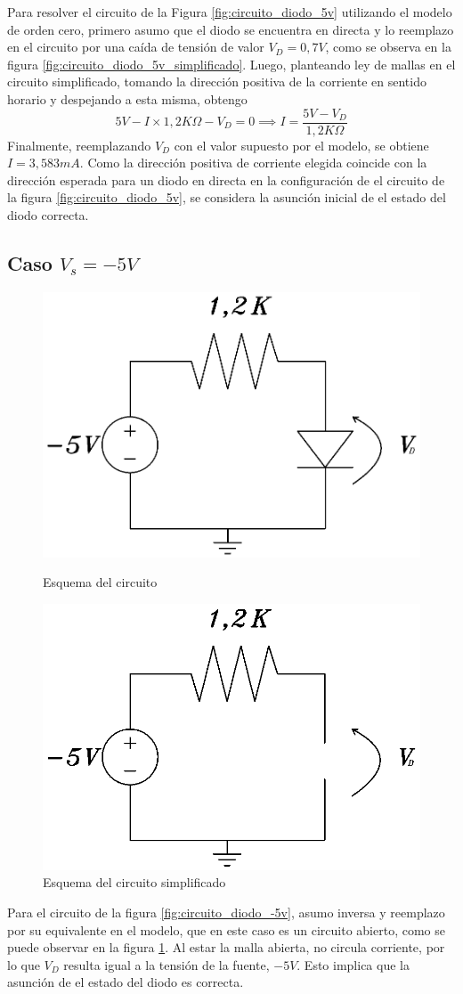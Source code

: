 \documentclass[10pt]{article}
\begin{document}
\quad Para resolver el circuito de la Figura \ref{fig:circuito_diodo_5v} utilizando el modelo de orden cero, primero asumo que el diodo se encuentra en directa y lo reemplazo en el circuito por una caída de tensión de valor $V_D = 0,7V$, como se observa en la figura \ref{fig:circuito_diodo_5v_simplificado}.
\quad Luego, planteando ley de mallas en el circuito simplificado, tomando la dirección positiva de la corriente en sentido horario y despejando a esta misma, obtengo 
$$5V-I\times1,2K\Omega-V_D=0 \implies I=\frac{5V-V_D}{1,2K\Omega}$$ Finalmente, reemplazando $V_D$ con el valor supuesto por el modelo, se obtiene $I = 3,583mA$. Como la dirección positiva de corriente elegida coincide con la dirección esperada para un diodo en directa en la configuración de el circuito de la figura \ref{fig:circuito_diodo_5v}, se considera la asunción inicial de el estado del diodo correcta.
\subsection{Caso $V_s = -5V$}
\begin{figure}[ht!]
\begin{minipage}{.5\textwidth}
\centering
\includegraphics[width=0.6\linewidth]{resources/circuito_diodo_-5v.png}
\caption{Esquema del circuito}
\label{fig:circuito_diodo_-5v}
\end{minipage}
\begin{minipage}{.5\textwidth}
\centering
\includegraphics[width=0.6\linewidth]{resources/circuito_diodo_-5v_simplificado.png}
\caption{Esquema del circuito simplificado}
\label{fig:circuito_diodo_-5v_simplificado}
\end{minipage}
\end{figure}
\quad Para el circuito de la figura \ref{fig:circuito_diodo_-5v}, asumo inversa y reemplazo por su equivalente en el modelo, que en este caso es un circuito abierto, como se puede observar en la figura \ref{fig:circuito_diodo_-5v_simplificado}. Al estar la malla abierta, no circula corriente, por lo que $V_D$ resulta igual a la tensión de la fuente, $-5V$. Esto implica que la asunción de el estado del diodo es correcta.
\end{document}

